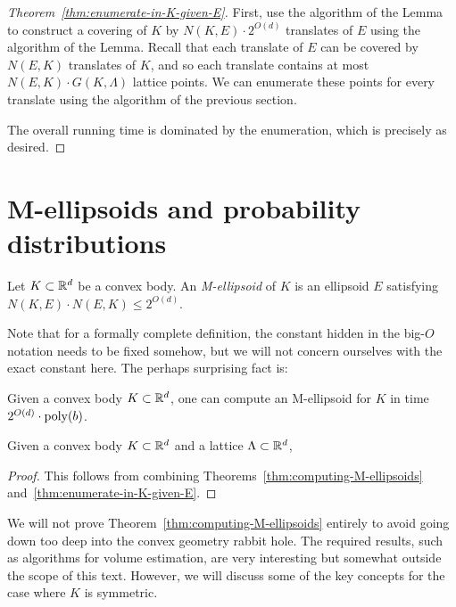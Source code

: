\begin{proof}[Theorem~\ref{thm:enumerate-in-K-given-E}]
  First, use the algorithm of the Lemma
  to construct a covering of $K$ by $N(K,E) \cdot 2^{O(d)}$ translates of $E$ using the algorithm of the Lemma.
  Recall that each translate of $E$ can be covered by $N(E,K)$ translates of $K$,
  and so each translate contains at most $N(E,K) \cdot G(K,\Lambda)$ lattice points.
  We can enumerate these points for every translate using the algorithm of the previous section.
  
  The overall running time is dominated by the enumeration,
  which is precisely as desired.
\end{proof}


\section{M-ellipsoids and probability distributions}

\begin{definition}
  Let $K \subset \mathbb{R}^d$ be a convex body.
  An \emph{M-ellipsoid} of $K$ is an ellipsoid $E$ satisfying
  $N(K,E) \cdot N(E,K) \leq 2^{O(d)}$.
\end{definition}

Note that for a formally complete definition,
the constant hidden in the big-$O$ notation needs to be fixed somehow,
but we will not concern ourselves with the exact constant here.
The perhaps surprising fact is:

\begin{theorem}
  \label{thm:computing-M-ellipsoids}
  Given a convex body $K \subset \mathbb{R}^d$,
  one can compute an M-ellipsoid for $K$
  in time $2^{O(d)} \cdot \operatorname{poly}(b)$.
\end{theorem}

\begin{corollary}
  Given a convex body $K \subset \mathbb{R}^d$ and a lattice $\Lambda \subset \mathbb{R}^d$,
\end{corollary}
\begin{proof}
  This follows from combining Theorems~\ref{thm:computing-M-ellipsoids} and~\ref{thm:enumerate-in-K-given-E}.
\end{proof}

We will not prove Theorem~\ref{thm:computing-M-ellipsoids} entirely
to avoid going down too deep into the convex geometry rabbit hole.
The required results, such as algorithms for volume estimation,
are very interesting but somewhat outside the scope of this text.
However, we will discuss some of the key concepts for the case where $K$ is symmetric.


